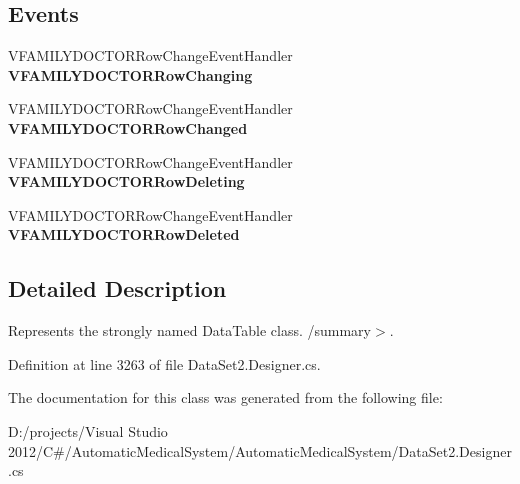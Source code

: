 \subsection*{Events}
\begin{CompactItemize}
\item 
VFAMILYDOCTORRowChangeEventHandler \textbf{VFAMILYDOCTORRowChanging}\label{class_automatic_medical_system_1_1_data_set2_1_1_v_f_a_m_i_l_y_d_o_c_t_o_r_data_table_d5716d3dee2844762f5c9452701257ef}

\item 
VFAMILYDOCTORRowChangeEventHandler \textbf{VFAMILYDOCTORRowChanged}\label{class_automatic_medical_system_1_1_data_set2_1_1_v_f_a_m_i_l_y_d_o_c_t_o_r_data_table_636d58289e7bec64a8e3ee8fe68613c3}

\item 
VFAMILYDOCTORRowChangeEventHandler \textbf{VFAMILYDOCTORRowDeleting}\label{class_automatic_medical_system_1_1_data_set2_1_1_v_f_a_m_i_l_y_d_o_c_t_o_r_data_table_bf915147253be5863c3346f49d8ef160}

\item 
VFAMILYDOCTORRowChangeEventHandler \textbf{VFAMILYDOCTORRowDeleted}\label{class_automatic_medical_system_1_1_data_set2_1_1_v_f_a_m_i_l_y_d_o_c_t_o_r_data_table_fee9ff86ddb3cd380f70c4256b6ce2b6}

\end{CompactItemize}


\subsection{Detailed Description}
Represents the strongly named DataTable class. /summary$>$. 

Definition at line 3263 of file DataSet2.Designer.cs.

The documentation for this class was generated from the following file:\begin{CompactItemize}
\item 
D:/projects/Visual Studio 2012/C\#/AutomaticMedicalSystem/AutomaticMedicalSystem/DataSet2.Designer.cs\end{CompactItemize}
